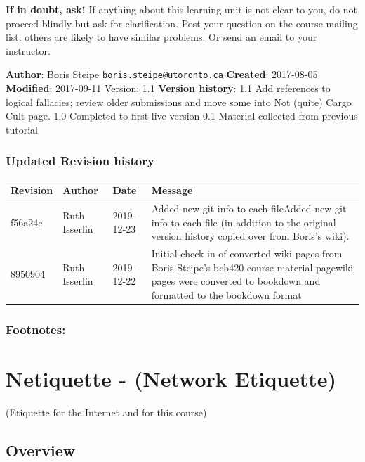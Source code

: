 \documentclass[]{book}
\let\BeginKnitrBlock\begin \let\EndKnitrBlock\end
\begin{document}
\textbf{If in doubt, ask!} If anything about this learning unit is not
clear to you, do not proceed blindly but ask for clarification. Post
your question on the course mailing list: others are likely to have
similar problems. Or send an email to your instructor.

\BeginKnitrBlock{rmd-original-history}
\textbf{Author}: Boris Steipe
\href{mailto:boris.steipe@utoronto.ca}{\nolinkurl{boris.steipe@utoronto.ca}}
\textbf{Created}: 2017-08-05 \textbf{Modified}: 2017-09-11 Version: 1.1
\textbf{Version history}: 1.1 Add references to logical fallacies;
review older submissions and move some into Not (quite) Cargo Cult page.
1.0 Completed to first live version 0.1 Material collected from previous
tutorial
\EndKnitrBlock{rmd-original-history}

\subsection{Updated Revision history}\label{updated-revision-history-4}

\begin{tabular}{l|l|l|l}
\hline
Revision & Author & Date & Message\\
\hline
f56a24c & Ruth Isserlin & 2019-12-23 & Added new git info to each fileAdded new git info to each file (in addition to the original version history copied over from Boris's wiki).\\
\hline
8950904 & Ruth Isserlin & 2019-12-22 & Initial check in of converted wiki pages from Boris Steipe's bcb420 course material pagewiki pages were converted to bookdown and formatted to the bookdown format\\
\hline
\end{tabular}

\subsection{Footnotes:}\label{footnotes-2}

\chapter{Netiquette - (Network
Etiquette)}\label{netiquette---network-etiquette}

(Etiquette for the Internet and for this course)

\section{Overview}\label{overview-6}
\end{document}

